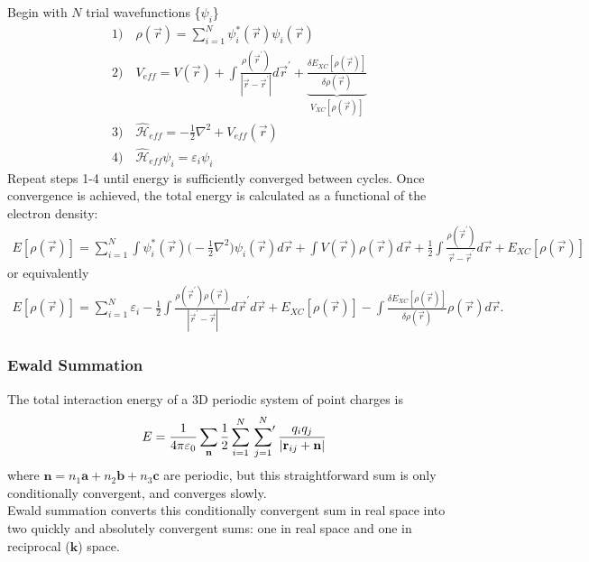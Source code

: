 \documentclass{beamer}
\newcommand{\Ham}{\widehat{\mathcal{H}}}
\newcommand{\rhovr}{\rho(\vec{r})}
\newenvironment{noheadline}{
	\setbeamertemplate{headline}{}
	\addtobeamertemplate{frametitle}{\vspace*{-0.9\baselineskip}}{}
}{}
\begin{document}
\begin{noheadline}
\begin{frame}
{	Begin with $N$ trial wavefunctions \{$\psi_{i}$\}
	\begin{align*}
	&1)\quad \rhovr = \sum_{i=1}^{N} \psi_{i}^{*}(\vec{r}) \psi_{i}(\vec{r})\\
	&2)\quad V_{eff} = V (\vec{r}) + \int \frac{\rho (\vec{r}^{\prime})}{|\vec{r} - \vec{r}^{\prime} |} d\vec{r}^{\prime} + \underbrace{\frac{\delta E_{XC}[\rhovr]}{\delta \rhovr}}_{V_{XC}[\rhovr]}\\
	&3)\quad \Ham_{eff} = -\frac{1}{2} \nabla^{2} + V_{eff} (\vec{r})\\
	&4)\quad \Ham_{eff}\psi_{i} = \varepsilon_{i}\psi_{i}
	\end{align*}
	Repeat steps 1-4 until energy is sufficiently converged between cycles. Once convergence is achieved, the total energy is calculated as a functional of the electron density:
	\begin{align*}
	E[\rhovr] = \sum_{i=1}^{N} \int \psi_{i}^{*}(\vec{r}) \big( -\frac{1}{2} \nabla^{2} \big) \psi_{i}(\vec{r}) d\vec{r} + \int V (\vec{r}) \rhovr d\vec{r} + \frac{1}{2} \int \frac{\rho(\vec{r}^{\prime})}{\vec{r} - \vec{r}^{\prime}} d\vec{r} + E_{XC}[\rhovr]
	\end{align*}
	or equivalently
	\begin{align*}
	E[\rhovr] = \sum_{i=1}^{N} \varepsilon_{i} - \frac{1}{2} \int \frac{\rho(\vec{r}^{\prime})\rhovr}{|\vec{r}^{\prime} - \vec{r}|} d\vec{r}^{\prime}d\vec{r} + E_{XC} [\rhovr] - \int \frac { \delta E _ { XC } [ \rhovr ] } { \delta \rhovr } \rhovr d \vec { r }.
	\end{align*}
}
\end{frame}



\begin{frame}
\frametitle{Ewald Summation}
The total interaction energy of a 3D periodic system of point charges is
\begin{equation*}
E = \frac { 1 } { 4 \pi \varepsilon _ { 0 } } \sum _ { \mathbf { n } } \frac{1}{2} \sum _ { i = 1 } ^ { N } \sideset{}{'}\sum _ { j = 1} ^ { N} \frac { q _ { i } q _ { j } } { \left| \mathbf { r } _ { i j } + \mathbf { n } \right| }
\end{equation*}
where $\mathbf{n} = n_1 \mathbf{a} + n_2 \mathbf{b} + n_3 \mathbf{c}$ are periodic, but this straightforward sum is only conditionally convergent, and converges slowly.\\
\vspace{1em}
Ewald summation converts this conditionally convergent sum in real space into two quickly and absolutely convergent sums: one in real space and one in reciprocal ($\mathbf{k}$) space.
\end{frame}


\end{noheadline}
\end{document}
